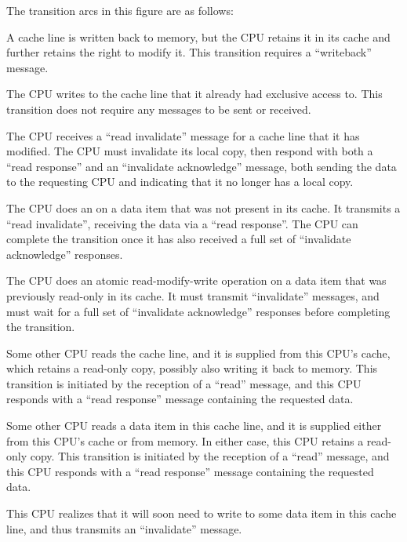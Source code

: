 The transition arcs in this figure are as follows:
\begin{description}[style=nextline]
\item	[Transition (a):]
	A cache line is written back to memory, but the CPU retains
	it in its cache and further retains the right to modify it.
	This transition requires a ``writeback'' message.
\item	[Transition (b):]
	The CPU writes to the cache line that it already had exclusive
	access to.
	This transition does not require any messages to be sent or
	received.
\item	[Transition (c):]
	The CPU receives a ``read invalidate'' message for a cache line
	that it has modified.
	The CPU must invalidate its local copy, then respond with both a
	``read response'' and an ``invalidate acknowledge'' message,
	both sending the data to the requesting CPU and indicating
	that it no longer has a local copy.
\item	[Transition (d):]
	The CPU does an  on a data item
	that was not present in its cache.
	It transmits a ``read invalidate'', receiving the data via
	a ``read response''.
	The CPU can complete the transition once it has also received a
	full set of ``invalidate acknowledge'' responses.
\item	[Transition (e):]
	The CPU does an atomic read-modify-write operation on a data item
	that was previously read-only in its cache.
	It must transmit ``invalidate'' messages, and must wait for a
	full set of ``invalidate acknowledge'' responses before completing
	the transition.
\item	[Transition (f):]
	Some other CPU reads the cache line, and it is supplied from
	this CPU's cache, which retains a read-only copy, possibly also
	writing it back to memory.
	This transition is initiated by the reception of a ``read''
	message, and this CPU responds with a ``read response'' message
	containing the requested data.
\item	[Transition (g):]
	Some other CPU reads a data item in this cache line,
	and it is supplied either from this CPU's cache or from memory.
	In either case, this CPU retains a read-only copy.
	This transition is initiated by the reception of a ``read''
	message, and this CPU responds with a ``read response'' message
	containing the requested data.
\item	[Transition (h):]
	This CPU realizes that it will soon need to write to some data
	item in this cache line, and thus transmits an ``invalidate'' message.

\end{description}
